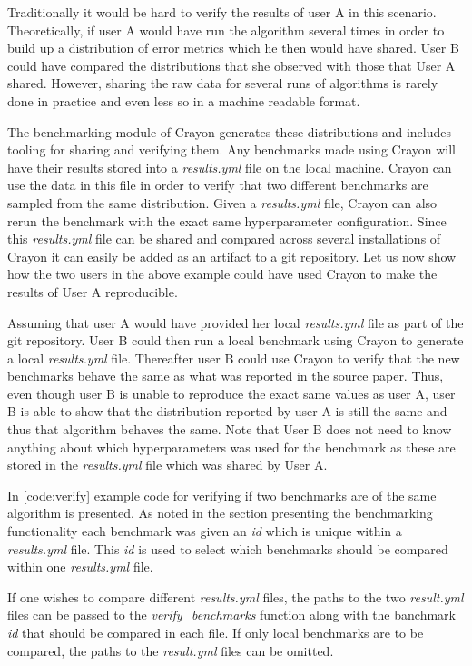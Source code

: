 Traditionally it would be hard to verify the results of user A in this scenario. Theoretically, if user A would have run the algorithm several times in order to build up a distribution of error metrics which he then would have shared. User B could have compared the distributions that she observed with those that User A shared. However, sharing the raw data for several runs of algorithms is rarely done in practice and even less so in a machine readable format.

The benchmarking module of Crayon generates these distributions and includes tooling for sharing and verifying them. Any benchmarks made using Crayon will have their results stored into a \textit{results.yml} file on the local machine. Crayon can use the data in this file in order to verify that two different benchmarks are sampled from the same distribution. Given a \textit{results.yml} file, Crayon can also rerun the benchmark with the exact same hyperparameter configuration. Since this \textit{results.yml} file can be shared and compared across several installations of Crayon it can easily be added as an artifact to a git repository. Let us now show how the two users in the above example could have used Crayon to make the results of User A reproducible.

Assuming that user A would have provided her local \textit{results.yml} file as part of the git repository. User B could then run a local benchmark using Crayon to generate a local \textit{results.yml} file. Thereafter user B could use Crayon to verify that the new benchmarks behave the same as what was reported in the source paper. Thus, even though user B is unable to reproduce the exact same values as user A, user B is able to show that the distribution reported by user A is still the same and thus that algorithm behaves the same. Note that User B does not need to know anything about which hyperparameters was used for the benchmark as these are stored in the \textit{results.yml} file which was shared by User A.

In \ref{code:verify} example code for verifying if two benchmarks are of the same algorithm is presented. As noted in the section presenting the benchmarking functionality each benchmark was given an \textit{id} which is unique within a \textit{results.yml} file. This \textit{id} is used to select which benchmarks should be compared within one \textit{results.yml} file.

If one wishes to compare different \textit{results.yml} files, the paths to the two \textit{result.yml} files can be passed to the \textit{verify\_benchmarks} function along with the banchmark \textit{id} that should be compared in each file. If only local benchmarks are to be compared, the paths to the \textit{result.yml} files can be omitted.

